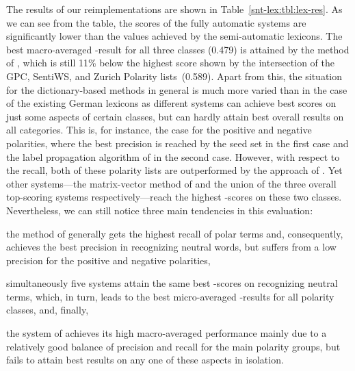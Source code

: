 The results of our reimplementations are shown in
Table~\ref{snt-lex:tbl:lex-res}.  As we can see from the table, the
scores of the fully automatic systems are significantly lower than the
values achieved by the semi-automatic lexicons.  The best
macro-averaged \F{}-result for all three classes (0.479) is attained
by the method of \citet{Blair-Goldensohn:08}, which is still 11\%
below the highest score shown by the intersection of the GPC, SentiWS,
and Zurich Polarity lists~(0.589).  Apart from this, the situation for
the dictionary-based methods in general is much more varied than in
the case of the existing German lexicons as different systems can
achieve best scores on just some aspects of certain classes, but can
hardly attain best overall results on all categories.  This is, for
instance, the case for the positive and negative polarities, where the
best precision is reached by the seed set in the first case and the
label propagation algorithm of \citet{Rao:09} in the second case.
However, with respect to the recall, both of these polarity lists are
outperformed by the approach of \citet{Esuli:06c}.  Yet other
systems---the matrix-vector method of \citet{Blair-Goldensohn:08} and
the union of the three overall top-scoring systems
respectively---reach the highest \F{}-scores on these two classes.
Nevertheless, we can still notice three main tendencies in this
evaluation:
\begin{inparaenum}
\item the method of \citet{Esuli:06c} generally gets the highest
  recall of polar terms and, consequently, achieves the best precision
  in recognizing neutral words, but suffers from a low precision for
  the positive and negative polarities,
\item simultaneously five systems attain the same best \F{}-scores on
  recognizing neutral terms, which, in turn, leads to the best
  micro-averaged \F{}-results for all polarity classes, and, finally,
\item the system of \citet{Blair-Goldensohn:08} achieves its high
  macro-averaged performance mainly due to a relatively good balance
  of precision and recall for the main polarity groups, but fails to
  attain best results on any one of these aspects in isolation.
\end{inparaenum}



